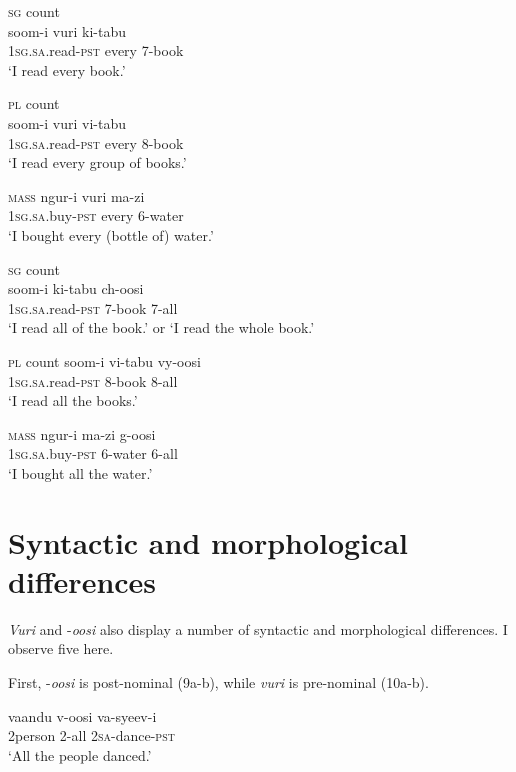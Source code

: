 \documentclass[output=paper]{langsci/langscibook}
\begin{document}
\ea
\textsc{sg} count\\
\gll soom-i      vuri    ki-tabu    \\
     1\textsc{sg.sa}.read-\textsc{pst}  every    7-book  \\
\glt ‘I read every book.’
\z

\ea
\textsc{pl} count\\
\gll soom-i      vuri    vi-tabu    \\
     1\textsc{sg.sa}.read-\textsc{pst}  every    8-book\\
\glt ‘I read every group of books.’
\z

\ea
\textsc{mass}
\gll ngur-i      vuri    ma-zi    \\
     1\textsc{sg.sa}.buy-\textsc{pst}    every    6-water\\
\glt ‘I bought every (bottle of) water.’
\z

\ea
\textsc{sg} count\\
\gll soom-i      ki-tabu  ch-oosi    \\
     1\textsc{sg.sa}.read-\textsc{pst}  7-book  7-all\\
\glt ‘I read all of the book.’ or ‘I read the whole book.’
\z

\ea
\textsc{pl} count
\gll soom-i      vi-tabu  vy-oosi  \\
     1\textsc{sg.sa}.read-\textsc{pst}  8-book  8-all\\
\glt ‘I read all the books.’
\z

\ea
\textsc{mass}
\gll ngur-i      ma-zi    g-oosi  \\
     1\textsc{sg.sa}.buy-\textsc{pst}    6-water  6-all\\
\glt ‘I bought all the water.’
\z

\section{Syntactic and morphological differences}

\textit{Vuri} and -\textit{oosi} also display a number of syntactic and morphological differences. I observe five here.

  First, -\textit{oosi} is post-nominal (9a-b), while \textit{vuri} is pre-nominal (10a-b). 

\ea
\gll vaandu    v-oosi    va-syeev-i    \\
     2person    2-all    2\textsc{sa}{}-dance-\textsc{pst}       \\
\glt ‘All the people danced.’
\z
\end{document}
